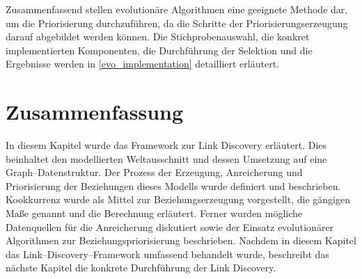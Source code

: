 Zusammenfassend stellen evolutionäre Algorithmen eine geeignete Methode dar, um die Priorisierung durchzuführen, da die Schritte der Priorisierungserzeugung darauf abgebildet werden können. Die Stichprobenauswahl, die konkret implementierten Komponenten, die Durchführung der Selektion und die Ergebnisse werden in \cref{evo_implementation} detailliert erläutert.

\section{Zusammenfassung}

In diesem Kapitel wurde das Framework zur Link Discovery erläutert. Dies beinhaltet den modellierten Weltausschnitt und dessen Umsetzung auf eine Graph--Datenstruktur. Der Prozess der Erzeugung, Anreicherung und Priorisierung der Beziehungen dieses Modells wurde definiert und beschrieben. Kookkurrenz wurde als Mittel zur Beziehungserzeugung vorgestellt, die gängigen Maße genannt und die Berechnung erläutert. Ferner wurden mögliche Datenquellen für die Anreicherung diskutiert sowie der Einsatz evolutionärer Algorithmen zur Beziehungspriorisierung beschrieben. Nachdem in diesem Kapitel das Link--Discovery--Framework umfassend behandelt wurde, beschreibt das nächste Kapitel die konkrete Durchführung der Link Discovery.